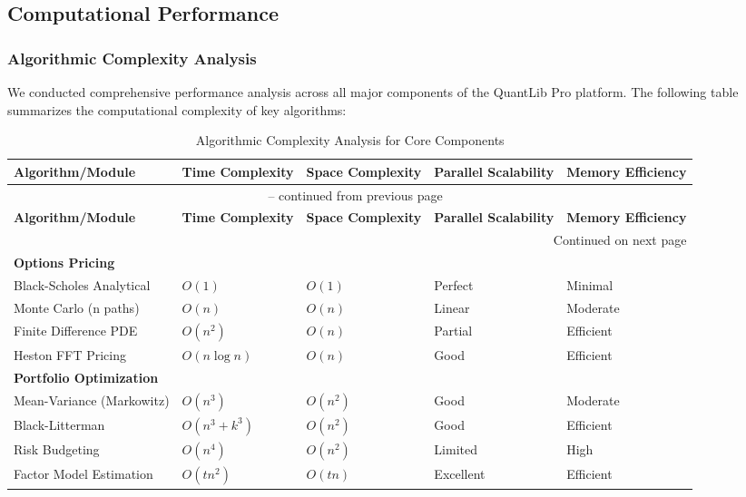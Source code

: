 \documentclass[12pt,a4paper]{article}
\theoremstyle{definition}
\theoremstyle{remark}
\begin{document}
\subsection{Computational Performance}

\subsubsection{Algorithmic Complexity Analysis}

We conducted comprehensive performance analysis across all major components of the QuantLib Pro platform. The following table summarizes the computational complexity of key algorithms:

\begin{longtable}{p{4cm}p{2cm}p{2cm}p{2cm}p{2cm}}
\caption{Algorithmic Complexity Analysis for Core Components} \\
\toprule
\textbf{Algorithm/Module} & \textbf{Time Complexity} & \textbf{Space Complexity} & \textbf{Parallel Scalability} & \textbf{Memory Efficiency} \\
\midrule
\endfirsthead
\multicolumn{5}{c}{{\tablename\ \thetable{} -- continued from previous page}} \\
\toprule
\textbf{Algorithm/Module} & \textbf{Time Complexity} & \textbf{Space Complexity} & \textbf{Parallel Scalability} & \textbf{Memory Efficiency} \\
\midrule
\endhead
\multicolumn{5}{r}{{Continued on next page}} \\
\endfoot
\bottomrule
\endlastfoot
\textbf{Options Pricing} & & & & \\
Black-Scholes Analytical & $O(1)$ & $O(1)$ & Perfect & Minimal \\
Monte Carlo (n paths) & $O(n)$ & $O(n)$ & Linear & Moderate \\
Finite Difference PDE & $O(n^2)$ & $O(n)$ & Partial & Efficient \\
Heston FFT Pricing & $O(n \log n)$ & $O(n)$ & Good & Efficient \\
\midrule
\textbf{Portfolio Optimization} & & & & \\
Mean-Variance (Markowitz) & $O(n^3)$ & $O(n^2)$ & Good & Moderate \\
Black-Litterman & $O(n^3 + k^3)$ & $O(n^2)$ & Good & Efficient \\
Risk Budgeting & $O(n^4)$ & $O(n^2)$ & Limited & High \\
Factor Model Estimation & $O(tn^2)$ & $O(tn)$ & Excellent & Efficient \\
\midrule

\end{longtable}
\end{document}
